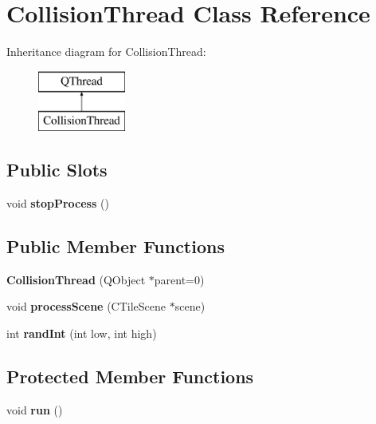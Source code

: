 \hypertarget{class_collision_thread}{}\section{Collision\+Thread Class Reference}
\label{class_collision_thread}
Inheritance diagram for Collision\+Thread\+:\begin{figure}[H]
\begin{center}
\leavevmode
\includegraphics[height=2.000000cm]{class_collision_thread}
\end{center}
\end{figure}
\subsection*{Public Slots}
\begin{DoxyCompactItemize}
\item 
\mbox{\label{class_collision_thread_a4ae79d681fed265756d2c48efd213026}} 
void {\bfseries stop\+Process} ()
\end{DoxyCompactItemize}
\subsection*{Public Member Functions}
\begin{DoxyCompactItemize}
\item 
\mbox{\label{class_collision_thread_a3cb7a49e90c05d31066133a6032a3a36}} 
{\bfseries Collision\+Thread} (Q\+Object $\ast$parent=0)
\item 
\mbox{\label{class_collision_thread_a0d75fdfd59426918d2f33620bd9576c2}} 
void {\bfseries process\+Scene} (C\+Tile\+Scene $\ast$scene)
\item 
\mbox{\label{class_collision_thread_a62880a04125cf4bece583430089e1433}} 
int {\bfseries rand\+Int} (int low, int high)
\end{DoxyCompactItemize}
\subsection*{Protected Member Functions}
\begin{DoxyCompactItemize}
\item 
\mbox{\label{class_collision_thread_a52aa20a085b0e6386ebaaa981212f5b1}} 
void {\bfseries run} ()
\end{DoxyCompactItemize}
